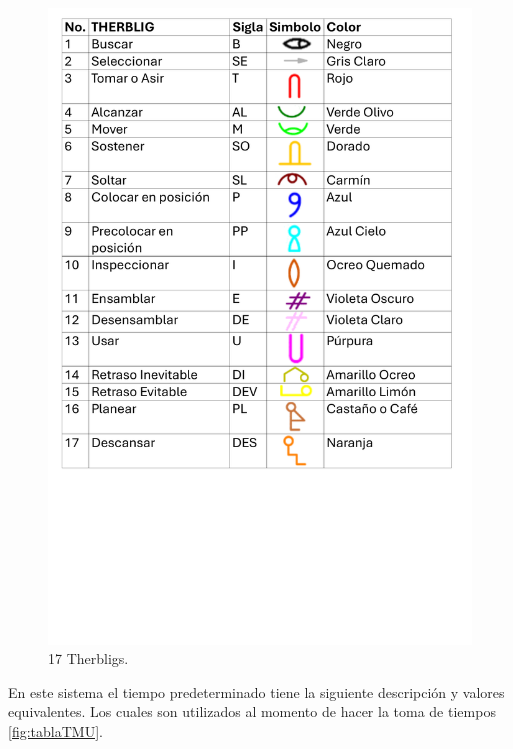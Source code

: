     \begin{figure}[H]
        \centering
        \includegraphics[scale=0.25]{15/img/tablaTherblig.pdf}
        \caption{17 Therbligs.}
        \label{fig:tablaTherbligs}
    \end{figure}
    
    En este sistema el tiempo predeterminado tiene la siguiente descripción y valores equivalentes. Los cuales son utilizados al momento de hacer la toma de tiempos \ref{fig:tablaTMU}.
    
